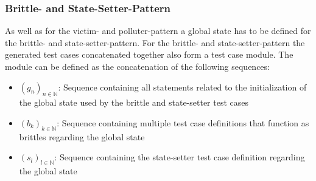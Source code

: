 \documentclass[
fancyheadings, %
%
%
]{stsreprt}
\begin{document}
\subsubsection{Brittle- and State-Setter-Pattern}
As well as for the victim- and polluter-pattern a global state has to be defined for the brittle- and state-setter-pattern. 
For the brittle- and state-setter-pattern the generated test cases concatenated together also form a test case module. 
The module can be defined as the concatenation of the following sequences:
\begin{itemize}
    \item $(g_n)_{n \in \mathbb{N}}$: Sequence containing all statements related to the initialization of the global state used by the brittle and state-setter test cases
    \item $(b_k)_{k \in \mathbb{N}}$: Sequence containing multiple test case definitions that function as brittles regarding the global state
    \item $(s_l)_{l \in \mathbb{N}}$: Sequence containing the state-setter test case definition regarding the global state
\end{itemize}
\end{document}
